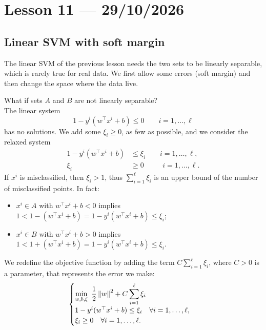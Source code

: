 \section{Lesson 11 --- 29/10/2026}

\subsection{Linear SVM with soft margin}

The linear SVM of the previous lesson needs the two sets to be linearly separable, which is rarely true for real data. We first allow some errors (soft margin) and then change the space where the data live.

What if sets $A$ and $B$ are not linearly separable?\\
The linear system
\[
    1 - y^i (w^\top x^i + b) \le 0 \qquad i = 1, \dots, \ell
\]
has no solutions. We add some  $\xi_i \ge 0$, as few as possible, and we consider the relaxed system
\[
    \begin{aligned}
        1 - y^i (w^\top x^i + b) &\le \xi_i \qquad i = 1, \dots, \ell, \\
        \xi_i &\ge 0 \qquad\ \ \, i = 1, \dots, \ell.
    \end{aligned}
\]
If $x^i$ is misclassified, then $\xi_i > 1$, thus $\sum_{i=1}^{\ell} \xi_i$ is an upper bound of the number of misclassified points. In fact:
\begin{itemize}
    \item $x^i \in A$ with $w^\top x^i + b < 0$ implies $1 < 1 - (w^\top x^i + b) = 1 - y^i (w^\top x^i + b) \le \xi_i$;
    \item $x^i \in B$ with $w^\top x^i + b > 0$ implies $1 < 1 + (w^\top x^i + b) = 1 - y^i (w^\top x^i + b) \le \xi_i$.
\end{itemize}

We redefine the objective function by adding the term $C\sum_{i=1}^{\ell}\xi_i$, where $C > 0$ is a parameter, that represents the error we make:
\begin{equation}
    \begin{cases}
        \displaystyle \min_{w, b, \xi} \ \frac{1}{2} \left\lVert w \right\rVert^2 + C \sum_{i=1}^{\ell} \xi_i \\
        1 - y^i (w^\top x^i + b) \le \xi_i \quad \forall i = 1, \dots, \ell, \\
        \xi_i \ge 0 \quad \forall i = 1, \dots, \ell.
    \end{cases}
    \label{eq:svm-soft}
\end{equation}

